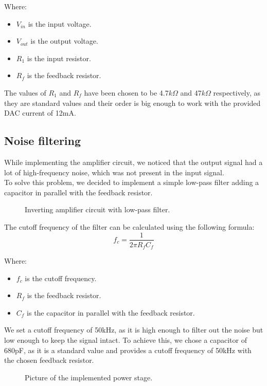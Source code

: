 Where:
\begin{itemize}
    \item $V_{in}$ is the input voltage.
    \item $V_{out}$ is the output voltage.
    \item $R_1$ is the input resistor.
    \item $R_f$ is the feedback resistor.
\end{itemize}

The values of $R_1$ and $R_f$ have been chosen to be 4.7$k\Omega$ and 47$k\Omega$ respectively, as they are standard values and their order is big enough to work with the provided DAC current of 12mA.

\subsection{Noise filtering}
While implementing the amplifier circuit, we noticed that the output signal had a lot of high-frequency noise, which was not present in the input signal. \\
To solve this problem, we decided to implement a simple low-pass filter adding a capacitor in parallel with the feedback resistor.

\begin{figure}
    \centering
    \resizebox{.7\linewidth}{!}{}
    \caption{Inverting amplifier circuit with low-pass filter.}
    \label{fig:non-inv_ampl_filter}
\end{figure}

The cutoff frequency of the filter can be calculated using the following formula:
\begin{equation}
    f_c = \frac{1}{2\pi R_f C_f}
\end{equation}

Where:
\begin{itemize}
    \item $f_c$ is the cutoff frequency.
    \item $R_f$ is the feedback resistor.
    \item $C_f$ is the capacitor in parallel with the feedback resistor.
\end{itemize}

We set a cutoff frequency of 50kHz, as it is high enough to filter out the noise but low enough to keep the signal intact.
To achieve this, we chose a capacitor of 680pF, as it is a standard value and provides a cutoff frequency of 50kHz with the chosen feedback resistor.

\begin{figure}
    \centering
    \caption{Picture of the implemented power stage.}
    \label{fig:IRL_power_stage}
\end{figure}
